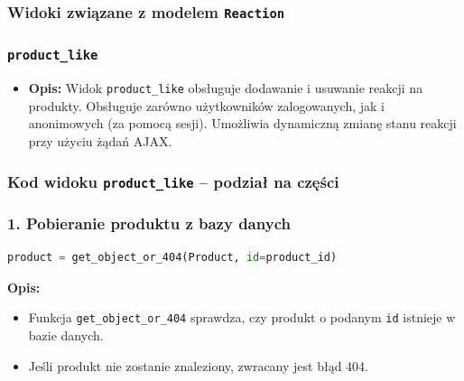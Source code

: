 \documentclass[12pt,a4paper,oneside]{article}
\theoremstyle{definition}
\numberwithin{equation}{section}
\begin{document}
\subsubsection{Widoki związane z modelem \texttt{Reaction}}

\subsubsection*{\texttt{product\_like}}
\begin{itemize}
    \item \textbf{Opis:} 
    Widok \texttt{product\_like} obsługuje dodawanie i usuwanie reakcji na produkty. Obsługuje zarówno użytkowników zalogowanych, jak i anonimowych (za pomocą sesji). Umożliwia dynamiczną zmianę stanu reakcji przy użyciu żądań AJAX.
\end{itemize}

\subsubsection*{Kod widoku \texttt{product\_like} – podział na części}

\subsubsection*{1. Pobieranie produktu z bazy danych}
\begin{lstlisting}[language=Python, caption=Fragment kodu: Pobieranie produktu]
product = get_object_or_404(Product, id=product_id)
\end{lstlisting}
\textbf{Opis:}
\begin{itemize}
    \item Funkcja \texttt{get\_object\_or\_404} sprawdza, czy produkt o podanym \texttt{id} istnieje w bazie danych.
    \item Jeśli produkt nie zostanie znaleziony, zwracany jest błąd 404.
\end{itemize}
\end{document}
